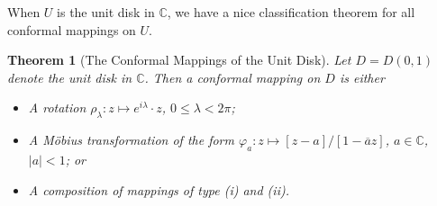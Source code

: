 \documentclass[10pt]{article}
\theoremstyle{plain}
\newtheorem{theorem}{Theorem}
\begin{document}
	When $U$ is the unit disk in $\mathbb{C}$, we have a nice classification theorem for all conformal mappings on $U$. 
	
	\begin{theorem}[The Conformal Mappings of the Unit Disk]
		Let $D = D(0, 1)$ denote the unit disk in $\mathbb{C}$. Then a conformal mapping on $D$ is either
			\begin{itemize}
				\item[(i)] A rotation $\rho_\lambda : z \mapsto e^{i \lambda} \cdot z$, $0 \leq \lambda < 2 \pi$;
				
				\item[(ii)] A Möbius transformation of the form $\varphi_a : z \mapsto [z - a]/[1 - \overline{a} z]$, $a \in \mathbb{C}$, $|a| < 1$; or 
				
				\item[(iii)] A composition of mappings of type (i) and (ii).
			\end{itemize}
	\end{theorem}
\end{document}
